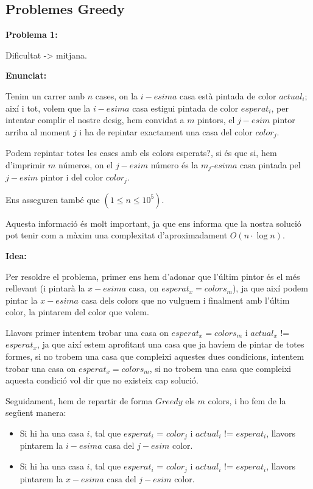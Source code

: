 \subsection{Problemes Greedy}

\textbf{Problema 1:} \newline

Dificultat -> mitjana. \newline

\textbf{Enunciat:} \newline

Tenim un carrer amb $n$ cases, on la $i-esima$ casa està pintada de color $actual_{i}$; així i tot, volem que la $i-esima$ casa estigui pintada de color $esperat_{i}$, per intentar complir el nostre desig, hem convidat a $m$ pintors, el $j-esim$ pintor arriba al moment $j$ i ha de repintar exactament una casa del color $color_{j}$.

Podem repintar totes les cases amb els colors esperats?, si és que si, hem d'imprimir $m$ números, on el $j-esim$ número és la $m_{j}$-$esima$ casa pintada pel $j-esim$ pintor i del color $color_{j}$. \newline

Ens asseguren també que $(1\leq n \leq 10^5)$.

Aquesta informació és molt important, ja que ens informa que la nostra solució pot tenir com a màxim una complexitat d'aproximadament $O(n \cdot \log n)$. \newline

\textbf{Idea:} \newline

Per resoldre el problema, primer ens hem d'adonar que l'últim pintor és el més rellevant (i pintarà la $x-esima$ casa, on $esperat_{x} = colors_{m}$), ja que així podem pintar la $x-esima$ casa dels colors que no vulguem i finalment amb l'últim color, la pintarem del color que volem.

Llavors primer intentem trobar una casa on $esperat_{x} = colors_{m}$ i $actual_{x}$ != $esperat_{x}$, ja que així estem aprofitant una casa que ja havíem de pintar de totes formes, si no trobem una casa que compleixi aquestes dues condicions, intentem trobar una casa on $esperat_{x} = colors_{m}$, si no trobem una casa que compleixi aquesta condició vol dir que no existeix cap solució.

Seguidament, hem de repartir de forma $Greedy$ els $m$ colors, i ho fem de la següent manera:

\begin{itemize}
\item Si hi ha una casa $i$, tal que $esperat_{i}$ = $color_{j}$ i $actual_{i}$ != $esperat_{i}$, llavors pintarem la $i-esima$ casa del $j-esim$ color.
\item Si hi ha una casa $i$, tal que $esperat_{i}$ = $color_{j}$ i $actual_{i}$ != $esperat_{i}$, llavors pintarem la $x-esima$ casa del $j-esim$ color.
\end{itemize}

